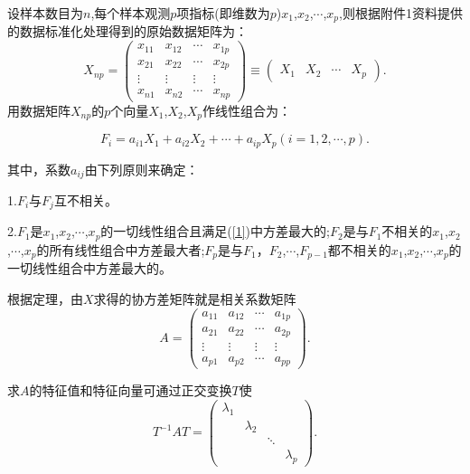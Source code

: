 \documentclass[bwprint]{gmcmthesis}
\begin{document}
设样本数目为$n$,每个样本观测$p$项指标(即维数为$p$)$x_1$,$x_2$,$\cdots$,$x_p$,则根据附件1资料提供的数据标准化处理得到的原始数据矩阵为：
\begin{equation}
\mathit{X}_{np}=\left( \begin{matrix}
	x_{11} & x_{12} & \cdots & x_{1p} \\ 
	x_{21} & x_{22} & \cdots & x_{2p} \\ 
	\vdots & \vdots & \vdots & \vdots \\ 
	x_{n1} & x_{n2} & \cdots & x_{np}
\end{matrix}\right) \equiv \left(
\begin{matrix}
\mathit{X}_1 & \mathit{X}_2 & \cdots & \mathit{X}_p
\end{matrix} 
\right).  
\end{equation}
用数据矩阵$\mathit{X}_{np}$的$p$个向量$\mathit{X}_1$,$\mathit{X}_2$,$\mathit{X}_p$作线性组合为：

\begin{equation}
\mathit{F}_i=a_{i1}\mathit{X}_1+a_{i2}\mathit{X}_2+\cdots+a_{ip}\mathit{X}_p(i=1,2,\cdots,p).
\label{1} 
\end{equation}

其中，系数$a_{ij}$由下列原则来确定：

1.$\mathit{F}_i$与$\mathit{F}_j$互不相关。

2.$\mathit{F}_1$是$x_1$,$x_2$,$\cdots$,$x_p$的一切线性组合且满足(\ref{1})中方差最大的;$\mathit{F}_2$是与$\mathit{F}_1$不相关的$x_1$,$x_2$,$\cdots$,$x_p$的所有线性组合中方差最大者;$\mathit{F}_p$是与$\mathit{F}_1$，$\mathit{F}_2$,$\cdots$,$\mathit{F}_{p-1}$都不相关的$x_1$,$x_2$,$\cdots$,$x_p$的一切线性组合中方差最大的。


根据定理，由$\mathit{X}$求得的协方差矩阵就是相关系数矩阵
\begin{equation}
	\mathit{A}=\left(\begin{matrix}
	a_{11} & a_{12} & \cdots & a_{1p} \\ 
	a_{21} & a_{22} & \cdots & a_{2p} \\ 
	\vdots & \vdots & \vdots & \vdots \\ 
	a_{p1} & a_{p2} & \cdots & a_{pp}
	\end{matrix} \right).
\end{equation}

求$A$的特征值和特征向量可通过正交变换$T$使
\begin{equation}
	T^{-1}AT=\left(\begin{matrix}
	\lambda_1 &  &  &  \\ 
	& \lambda_2 &  &  \\ 
	&  & \ddots &  \\ 
	&  &  & \lambda_p
	\end{matrix}  \right). 
\end{equation}
\end{document}
